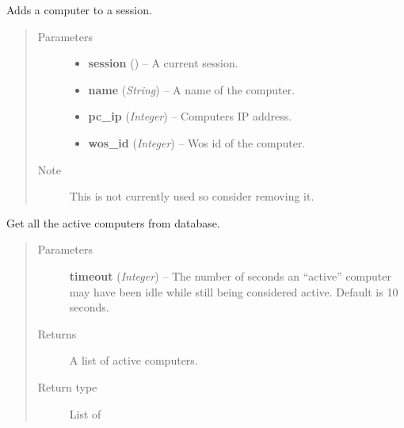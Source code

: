 \documentclass[letterpaper,10pt,english]{sphinxmanual}
\begin{document}
\begin{fulllineitems}
\label{controller:controller.computer.add_computer_to_session}
Adds a computer to a session.
\begin{quote}\begin{description}
\item[{Parameters}] \leavevmode\begin{itemize}
\item {} 
\textbf{session} ({\hyperref[models:models.Session]{}}) -- A current session.

\item {} 
\textbf{name} (\emph{String}) -- A name of the computer.

\item {} 
\textbf{pc\_ip} (\emph{Integer}) -- Computers IP address.

\item {} 
\textbf{wos\_id} (\emph{Integer}) -- Wos id of the computer.

\end{itemize}

\item[{Note }] \leavevmode
This is not currently used so consider removing it.

\end{description}\end{quote}

\end{fulllineitems}


\begin{fulllineitems}
\label{controller:controller.computer.get_active_computers}
Get all the active computers from database.
\begin{quote}\begin{description}
\item[{Parameters}] \leavevmode
\textbf{timeout} (\emph{Integer}) -- The number of seconds an ``active'' computer may have been idle while
still being considered active. Default is 10 seconds.

\item[{Returns}] \leavevmode
A list of active computers.

\item[{Return type}] \leavevmode
List of {\hyperref[models:models.Computer]{}}

\end{description}\end{quote}

\end{fulllineitems}
\end{document}
